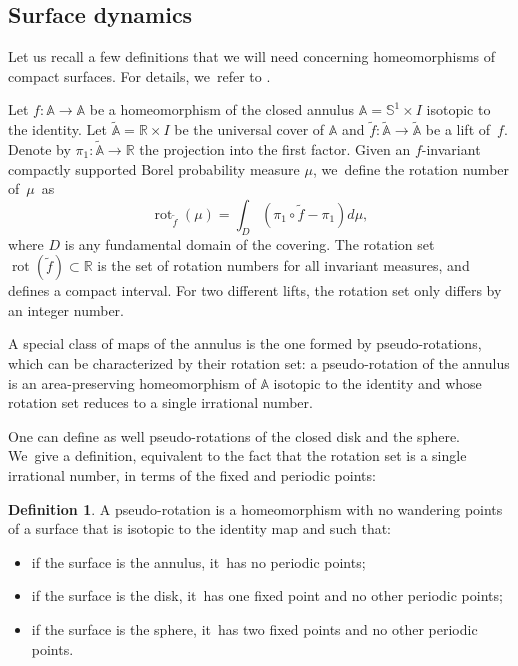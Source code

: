 \documentclass[11pt]{article}
\theoremstyle{definition}
\newtheorem{defi}[theorem]{Definition}
\newcommand{\mS}{\mathbb{S}}
\begin{document}
\subsection{Surface dynamics}\label{ssec-surfacedyn}
Let us recall a few definitions that we will need concerning homeomorphisms of compact surfaces. For details, we~refer to \cite{BCLP, Lec1}.

Let $f: \mathbb{A}\to \mathbb{A}$ be a homeomorphism of the closed annulus $\mathbb{A}=\mS^1\times I$ isotopic to the identity. Let $\widetilde{\mathbb{A}}=\mathbb{R}\times I$ be
the universal cover of $\mathbb{A}$ and $\widetilde f: \widetilde{\mathbb{A}} \to \widetilde{\mathbb{A}}$ be a lift of~$f$. Denote by $\pi_1: \widetilde{\mathbb{A}} \to \mathbb{R}$ the projection into the first factor. Given an $f$-invariant compactly supported Borel probability measure $\mu$, we~define the rotation number of~$\mu$~as
\[
\operatorname{rot}_{\widetilde f}(\mu)=\int_D (\pi_1\circ \widetilde f - \pi_1)d\mu,
\]
where $D$ is any fundamental domain of the covering. The rotation set $\operatorname{rot}(\widetilde f)\subset \mathbb{R}$ is the set of rotation numbers for all invariant measures, and defines a compact interval. For two different lifts, the rotation set only differs by an integer number.

A special class of maps of the annulus is the one formed by pseudo-rotations, which can be characterized by their rotation set:
a pseudo-rotation of the annulus is an area-preserving homeomorphism of $\mathbb{A}$ isotopic to the identity and whose rotation set reduces to a single irrational number.

One can define as well pseudo-rotations of the closed disk and the sphere. We~give a definition, equivalent to the fact that the rotation set is a single irrational number, in terms of the fixed and periodic points:
\begin{defi}
A pseudo-rotation is a homeomorphism with no wandering points of a surface that is isotopic to the identity map and such that:
\begin{itemize}
\item
if the surface is the annulus, it~has no periodic points;
\item
if the surface is the disk, it~has one fixed point and no other periodic points;
\item
if the surface is the sphere, it~has two fixed points and no other periodic points.
\end{itemize}
\end{defi}
\end{document}
